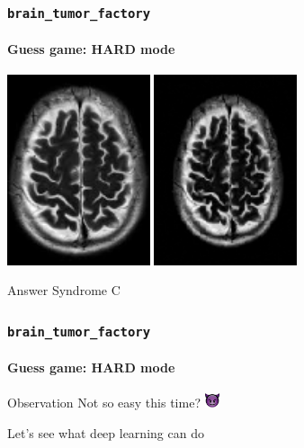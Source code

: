 \documentclass[]{beamer}
\newcommand{\btf}{\tt{brain\_tumor\_factory}}
\begin{document}
\begin{frame}
  \frametitle{\btf}
  \framesubtitle{Guess game: HARD mode}
  \begin{minipage}{\linewidth}
    \begin{center}
      \includegraphics[width=4.2cm]{resources/brain_base}
      \includegraphics[width=4.2cm]{resources/c3}
    \end{center}
  \end{minipage}
  \pause
  \begin{block}{Answer}
    Syndrome C
  \end{block}
\end{frame}

\begin{frame}
  \frametitle{\btf}
  \framesubtitle{Guess game: HARD mode}
  \begin{block}{Observation}
    Not so easy this time? \includegraphics[height=12pt]{resources/devil}
  \end{block}

  \vfill

  \begin{center}
    \Large
    Let's see what \alert{deep learning} can do
  \end{center}

  \vfill
\end{frame}
\end{document}
